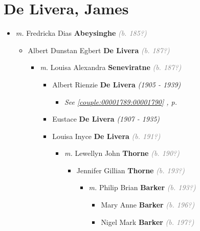 \documentclass[10pt, openany]{book}
\begin{document}
\chapter{De Livera, James}
\label{00001199}
\textcolor{slmaroon}{\textit{}}
\begin{itemize}
\item{\textit{m.} Fredricka Dias \textbf{Abeysinghe} \textcolor{gray}{\textit{(b. 185?)}}   \label{couple:00001199:00001200} \begin{itemize}
\item{Albert Dunstan Egbert \textbf{De Livera} \textcolor{gray}{\textit{(b. 187?)}}
\begin{itemize}
\item{\textit{m.} Louisa Alexandra \textbf{Seneviratne} \textcolor{gray}{\textit{(b. 187?)}}   \label{couple:00001205:00002239} \begin{itemize}
\item{Albert Rienzie \textbf{De Livera} \textcolor{slorange}{\textit{(1905 - 1939)}}
\begin{itemize}
\item{\textcolor{slteal}{\textit{See  \autoref{couple:00001789:00001790} \textit{, p. \pageref{couple:00001789:00001790} }}}}
\end{itemize}
   }
\item{Eustace \textbf{De Livera} \textcolor{slorange}{\textit{(1907 - 1935)}}
  }
\item{Louisa Inyce \textbf{De Livera} \textcolor{gray}{\textit{(b. 191?)}}
\begin{itemize}
\item{\textit{m.} Lewellyn John \textbf{Thorne} \textcolor{gray}{\textit{(b. 190?)}}   \label{couple:00002241:00002254} \begin{itemize}
\item{Jennifer Gillian \textbf{Thorne} \textcolor{gray}{\textit{(b. 193?)}}
\begin{itemize}
\item{\textit{m.} Philip Brian \textbf{Barker} \textcolor{gray}{\textit{(b. 193?)}}   \label{couple:00002255:00002264} \begin{itemize}
\item{Mary Anne \textbf{Barker} \textcolor{gray}{\textit{(b. 196?)}}
  }
\item{Nigel Mark \textbf{Barker} \textcolor{gray}{\textit{(b. 197?)}}
\begin{itemize}

\end{itemize}}
\end{itemize}}
\end{itemize}}
\end{itemize}}
\end{itemize}}
\end{itemize}}
\end{itemize}}
\end{itemize}}
\end{itemize}
\end{document}
